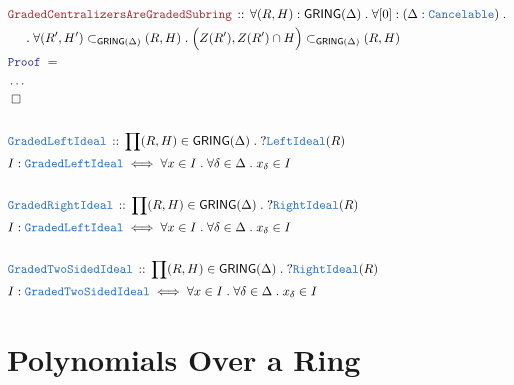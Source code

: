 \documentclass[12pt]{scrartcl}
\newcommand{\TYPE}[1]{\textcolor{NavyBlue}{\mathtt{#1}}}
\newcommand{\LOGIC}[1]{\textcolor{Blue}{\mathtt{#1}}}
\newcommand{\THM}[1]{\textcolor{Maroon}{\mathtt{#1}}}
\renewcommand{\.}{\; . \;}
\newcommand{\Theorem}[2]{& \THM{#1} \, :: \, #2 \\ & \Proof = \\ }
\newcommand{\DeclareType}[2]{& \TYPE{#1} \, :: \, #2 \\}
\newcommand{\DefineType}[3]{& #1 : \TYPE{#2} \iff #3 \\}
\newcommand{\NewLine}{\\ & \kern 1pc}
\newcommand{\Page}[1]{ \begin{align*} #1 \end{align*}   }
\newcommand{\NoProof}{ & \ldots \\ \EndProof}
\newcommand{\QED}{\; \square}
\newcommand{\EndProof}{& \QED \\}
\newcommand{\Proof}{\LOGIC{Proof} \; }
\newcommand{\GRING}{\mathsf{GRING}}
\begin{document}
\Page{
	\Theorem{GradedCentralizersAreGradedSubring}{
		\forall (R,H) : \GRING(\Delta) \.
		\forall [0] : (\Delta : \TYPE{Cancelable}) \. \NewLine \.
		\forall (R',H') \subset_{\GRING(\Delta)} (R,H) \. 
		\Big(Z(R'),Z(R') \cap H \Big) \subset_{\GRING(\Delta)} (R,H)   
	}
	\NoProof
	\\
	\DeclareType{GradedLeftIdeal}{ \prod (R,H) \in \GRING(\Delta) \. ?\TYPE{LeftIdeal}(R)}
	\DefineType{I}{GradedLeftIdeal}{ \forall x \in I \. \forall \delta \in \Delta \. x_\delta \in I}
	\\
	\DeclareType{GradedRightIdeal}{ \prod (R,H) \in \GRING(\Delta) \. ?\TYPE{RightIdeal}(R)}
	\DefineType{I}{GradedLeftIdeal}{ \forall x \in I \. \forall \delta \in \Delta \. x_\delta \in I}
	\\
	\DeclareType{GradedTwoSidedIdeal}{ \prod (R,H) \in \GRING(\Delta) \. ?\TYPE{RightIdeal}(R)}
	\DefineType{I}{GradedTwoSidedIdeal}{\forall x \in I \. \forall \delta \in \Delta \. x_\delta \in I}
}

\section{Polynomials Over a Ring}
\end{document}
